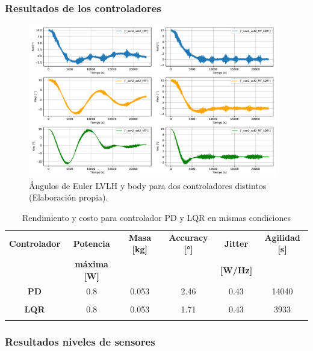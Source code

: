 \subsubsection{Resultados de los controladores}

\begin{figure}[H]
	\centering    
	\includegraphics[width=0.97\textwidth]{PD_LQR_nivel2.pdf}
	\caption{Ángulos de Euler LVLH y body para dos controladores distintos (Elaboración propia).}
	\label{fig:PD_LQR_nivel2}
\end{figure}


\begin{table}[h!]
	\centering
	\caption{Rendimiento y costo para controlador PD y LQR en mismas condiciones}
	\begin{tabular}{|c|c|c|c|c|c|}
		\hline
		\textbf{Controlador}   & \textbf{Potencia} & \textbf{Masa [kg]} & \textbf{Accuracy [°]} & \textbf{Jitter} & \textbf{Agilidad [s]}  \\ 
		  & \textbf{máxima [W]} & & & \textbf{[W/Hz]} &  \\
		\hline
		\textbf{PD}   & 0.8  & 0.053  & 2.46 & 0.43 & 14040   \\
		&  &   &  &  &    \\
		\hline
		\textbf{LQR}   & 0.8  & 0.053  & 1.71 & 0.43 & 3933   \\
		& & & & &   \\
		\hline
	\end{tabular}
	\label{tab:PD_LQR_nivel2}
\end{table}

\subsubsection{Resultados niveles de sensores}

